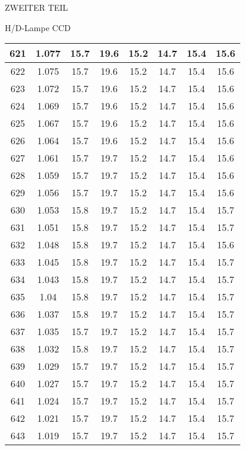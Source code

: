 \begin{appendix}
\begin{chapter}{ZWEITER TEIL}
\begin{section}{H/D-Lampe CCD}
\begin{scriptsize}
\begin{longtable}[htbp]{|c|c|c|c|c|c|c|c|}
            621 & 1.077 & 15.7 & 19.6 & 15.2 & 14.7 & 15.4 & 15.6 \\ \hline
            622 & 1.075 & 15.7 & 19.6 & 15.2 & 14.7 & 15.4 & 15.6 \\ \hline
            623 & 1.072 & 15.7 & 19.6 & 15.2 & 14.7 & 15.4 & 15.6 \\ \hline
            624 & 1.069 & 15.7 & 19.6 & 15.2 & 14.7 & 15.4 & 15.6 \\ \hline
            625 & 1.067 & 15.7 & 19.6 & 15.2 & 14.7 & 15.4 & 15.6 \\ \hline
            626 & 1.064 & 15.7 & 19.6 & 15.2 & 14.7 & 15.4 & 15.6 \\ \hline
            627 & 1.061 & 15.7 & 19.7 & 15.2 & 14.7 & 15.4 & 15.6 \\ \hline
            628 & 1.059 & 15.7 & 19.7 & 15.2 & 14.7 & 15.4 & 15.6 \\ \hline
            629 & 1.056 & 15.7 & 19.7 & 15.2 & 14.7 & 15.4 & 15.6 \\ \hline
            630 & 1.053 & 15.8 & 19.7 & 15.2 & 14.7 & 15.4 & 15.7 \\ \hline
            631 & 1.051 & 15.8 & 19.7 & 15.2 & 14.7 & 15.4 & 15.7 \\ \hline
            632 & 1.048 & 15.8 & 19.7 & 15.2 & 14.7 & 15.4 & 15.6 \\ \hline
            633 & 1.045 & 15.8 & 19.7 & 15.2 & 14.7 & 15.4 & 15.7 \\ \hline
            634 & 1.043 & 15.8 & 19.7 & 15.2 & 14.7 & 15.4 & 15.7 \\ \hline
            635 & 1.04 & 15.8 & 19.7 & 15.2 & 14.7 & 15.4 & 15.7 \\ \hline
            636 & 1.037 & 15.8 & 19.7 & 15.2 & 14.7 & 15.4 & 15.7 \\ \hline
            637 & 1.035 & 15.7 & 19.7 & 15.2 & 14.7 & 15.4 & 15.7 \\ \hline
            638 & 1.032 & 15.8 & 19.7 & 15.2 & 14.7 & 15.4 & 15.7 \\ \hline
            639 & 1.029 & 15.7 & 19.7 & 15.2 & 14.7 & 15.4 & 15.7 \\ \hline
            640 & 1.027 & 15.7 & 19.7 & 15.2 & 14.7 & 15.4 & 15.7 \\ \hline
            641 & 1.024 & 15.7 & 19.7 & 15.2 & 14.7 & 15.4 & 15.7 \\ \hline
            642 & 1.021 & 15.7 & 19.7 & 15.2 & 14.7 & 15.4 & 15.7 \\ \hline
            643 & 1.019 & 15.7 & 19.7 & 15.2 & 14.7 & 15.4 & 15.7 \\ \hline

\end{longtable}
\end{scriptsize}
\end{section}
\end{chapter}
\end{appendix}
